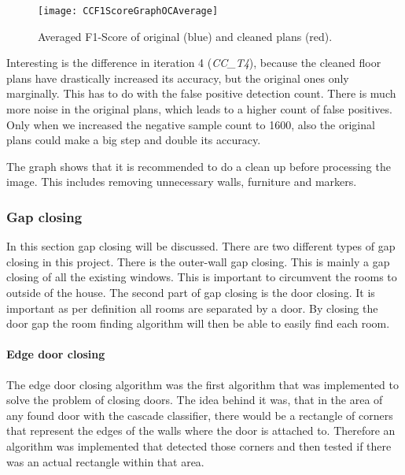 \begin{figure}[H]
	\centering
	\texttt{[image: CCF1ScoreGraphOCAverage]}
	\caption{Averaged F1-Score of original (blue) and cleaned plans (red).}
	\label{fig:CCF1ScoreGraphOCAverage}
\end{figure}

Interesting is the difference in iteration 4 (\textit{CC\_T4}), because the cleaned floor plans have drastically increased its accuracy, but the original ones only marginally. This has to do with the false positive detection count. There is much more noise in the original plans, which leads to a higher count of false positives. Only when we increased the negative sample count to 1600, also the original plans could make a big step and double its accuracy.

The graph shows that it is recommended to do a clean up before processing the image. This includes removing unnecessary walls, furniture and markers.


\subsubsection{Gap closing}
\label{sub:GapClosing}
In this section gap closing will be discussed. There are two different types of gap closing in this project. There is the outer-wall gap closing. This is mainly a gap closing of all the existing windows. This is important to circumvent the rooms to outside of the house. The second part of gap closing is the door closing. It is important as per definition all rooms are separated by a door. By closing the door gap the room finding algorithm will then be able to easily find each room.
\paragraph{Edge door closing}
The edge door closing algorithm was the first algorithm that was implemented to solve the problem of closing doors. The idea behind it was, that in the area of any found door with the cascade classifier, there would be a rectangle of corners that represent the edges of the walls where the door is attached to. Therefore an algorithm was implemented that detected those corners and then tested if there was an actual rectangle within that area.

